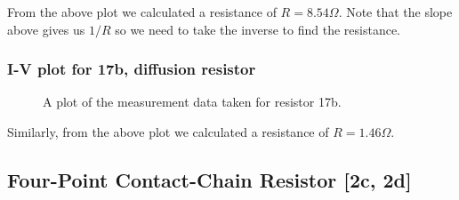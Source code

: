 \documentclass{article}
\begin{document}
From the above plot we calculated a resistance of $R = 8.54 \Omega$. Note that the slope above gives us $1/R$ so we need to take the inverse to find the resistance.

\subsubsection{I-V plot for 17b, diffusion resistor}
\begin{figure}[H]
\centering
{}
\caption{A plot of the measurement data taken for resistor 17b.}
\end{figure}

Similarly, from the above plot we calculated a resistance of $R = 1.46 \Omega$.

\subsection{Four-Point Contact-Chain Resistor [2c, 2d]} %
\end{document}
